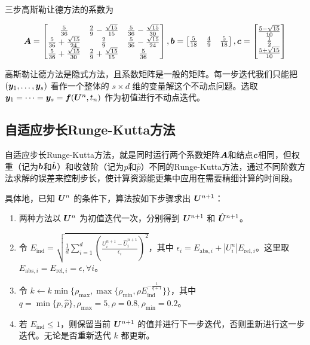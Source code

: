 \documentclass[lang=cn,a4paper,newtx,bibend=bibtex]{elegantpaper}
\begin{document}
三步高斯勒让德方法的系数为

\begin{equation*}
    \bm{A} = \begin{bmatrix} 
        \frac 5{36} & \frac 29 - \frac{\sqrt{15}}{15} & \frac 5{36} - \frac{\sqrt{15}}{30} \\
        \frac{5}{36} + \frac{\sqrt{15}}{24} & \frac 29 & \frac 5{36} - \frac{\sqrt{15}}{24} \\
        \frac 5{36} + \frac{\sqrt{15}}{30} & \frac 29 + \frac{\sqrt{15}}{15} & \frac 5{36} \\
     \end{bmatrix},
    \bm{b} = \begin{bmatrix} \frac 5{18} & \frac 49 & \frac 5{18} \end{bmatrix},
    \bm{c} = \begin{bmatrix} \frac{5-\sqrt{15}}{10} \\ \frac 12 \\ \frac{5+\sqrt{15}}{10} \\ \end{bmatrix}
\end{equation*}

高斯勒让德方法是隐式方法，且系数矩阵是一般的矩阵。每一步迭代我们只能把 $(\bm{y}_1,\dots,\bm{y}_s)$ 看作一个整体的 $s\times d$ 维的变量解这个不动点问题。选取 $\bm{y}_1 = \dots = \bm{y}_s = \bm{f}(\bm{U}^n, t_n)$ 作为初值进行不动点迭代。

\subsection{自适应步长Runge-Kutta方法}

自适应步长Runge-Kutta方法，就是同时运行两个系数矩阵$\bm{A}$和结点$\bm{c}$相同，但权重（记为$\bm{b}$和$\hat{\bm{b}}$）和收敛阶（记为$p$和$\hat{p}$）不同的Runge-Kutta方法，通过不同阶数方法求解的误差来控制步长，使计算资源能更集中应用在需要精细计算的时间段。

具体地，已知 $\bm{U}^n$ 的条件下，算法按如下步骤求出 $\bm{U}^{n+1}$：

\begin{enumerate}
    \item 两种方法以 $\bm{U}^n$ 为初值迭代一次，分别得到 $\bm{U}^{n+1}$ 和 $\hat{\bm{U}}^{n+1}$。
    \item 令 $E_{\mathrm{ind}} = \sqrt{\frac 1d\sum_{i=1}^d(\frac{U_i^{n+1}-\hat{U}_i^{n+1}}{\epsilon_i})^2}$，其中 $\epsilon_i = E_{\mathrm{abs},i}+|U_i^n|E_{\mathrm{rel},i}$。这里取 $E_{\mathrm{abs},i} = E_{\mathrm{rel},i} = \epsilon, \forall i$。
    \item 令 $k\leftarrow k\min\{\rho_{\max}, \max\{\rho_{\min}, \rho E_{\mathrm{ind}}^{-\frac 1{q+1}}\}\}$，其中 $q = \min\{p, \hat{p}\}, \rho_{\max} = 5, \rho = 0.8, \rho_{\min} = 0.2$。
    \item 若 $E_{\mathrm{ind}}\leq 1$，则保留当前 $\bm{U}^{n+1}$ 的值并进行下一步迭代，否则重新进行这一步迭代。无论是否重新迭代 $k$ 都更新。
\end{enumerate}
\end{document}
